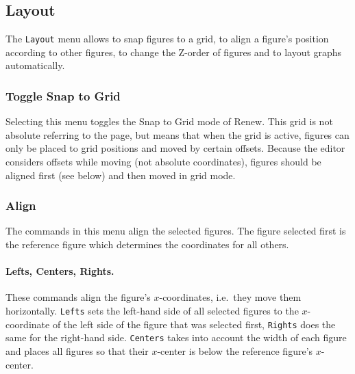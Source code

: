 
\subsection{Layout}
\label{subsubsec:netlayout}

The \texttt{Layout} menu allows to snap figures to a grid, to
align a figure's position according to other figures, to change the
Z-order of figures and to layout graphs automatically.

\subsubsection{Toggle Snap to Grid}

Selecting this menu toggles the Snap to Grid mode of Renew.
This grid is not absolute referring to the page, but
means that when the grid is active, figures can only be
placed to grid positions and moved by certain offsets.
Because the editor considers offsets while moving (not absolute
coordinates), figures should be aligned first (see below) and
then moved in grid mode.

\subsubsection{Align}

The commands in this menu align the selected figures.
The figure selected first is the reference figure which
determines the coordinates for all others.

\paragraph{Lefts, Centers, Rights.}
These commands align the figure's $x$-coordinates, i.e.\ they move them
horizontally.
\texttt{Lefts} sets the left-hand side of all selected figures to
the $x$-coordinate of the left side of the figure that
was selected first, \texttt{Rights} does the same for the
right-hand side.
\texttt{Centers} takes into account the width of
each figure and places all figures so that their $x$-center
is below the reference figure's $x$-center.

